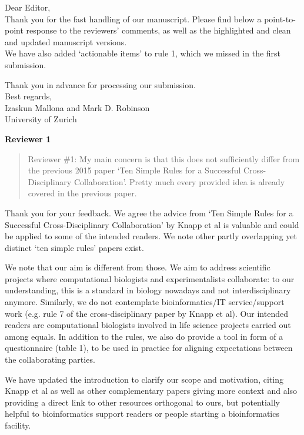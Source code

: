 \documentclass[a4paper]{article}
\begin{document}
\noindent Dear Editor,\\

Thank you for the fast handling of our manuscript. Please find below a point-to-point response to the reviewers' comments, as well as the highlighted and clean and updated manuscript versions.\\

We have also added `actionable items' to rule 1, which we missed in the first submission.

Thank you in advance for processing our submission. \\

Best regards,\\

\noindent Izaskun Mallona and Mark D. Robinson \\
\noindent University of Zurich

\vspace{1cm}

 \textbf{Reviewer 1}

\begin{quote}
    Reviewer \#1: My main concern is that this does not sufficiently differ from the previous 2015 paper `Ten Simple Rules for a Successful Cross-Disciplinary Collaboration'. Pretty much every provided idea is already covered in the previous paper.

\end{quote}

Thank you for your feedback. We agree the advice from `Ten Simple Rules for a Successful Cross-Disciplinary Collaboration' by Knapp et al is valuable and could be applied to some of the intended readers. We note other partly overlapping yet distinct `ten simple rules' papers exist.

We note that our aim is different from those. We aim to address scientific projects where computational biologists and experimentalists collaborate: to our understanding, this is a standard in biology nowadays and not interdisciplinary anymore. Similarly, we do not contemplate bioinformatics/IT service/support work (e.g. rule 7 of the cross-disciplinary paper by Knapp et al). Our intended readers are computational biologists involved in life science projects carried out among equals. 
In addition to the rules, we also do provide a tool in form of a questionnaire (table 1), to be used in practice for aligning expectations between the collaborating parties.

We have updated the introduction to clarify our scope and motivation, citing Knapp et al as well as other complementary papers giving more context and also providing a direct link to other resources orthogonal to ours, but potentially helpful to bioinformatics support readers or people starting a bioinformatics facility.\\
\end{document}
